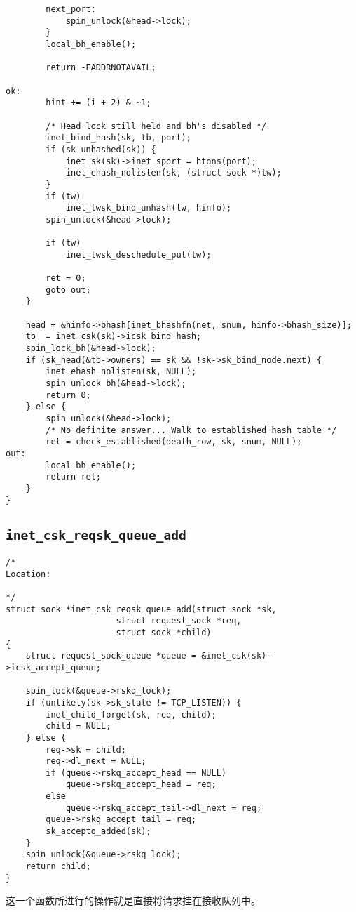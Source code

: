 \begin{verbatim}
        next_port:
            spin_unlock(&head->lock);
        }
        local_bh_enable();

        return -EADDRNOTAVAIL;

ok:
        hint += (i + 2) & ~1;

        /* Head lock still held and bh's disabled */
        inet_bind_hash(sk, tb, port);
        if (sk_unhashed(sk)) {
            inet_sk(sk)->inet_sport = htons(port);
            inet_ehash_nolisten(sk, (struct sock *)tw);
        }
        if (tw)
            inet_twsk_bind_unhash(tw, hinfo);
        spin_unlock(&head->lock);

        if (tw)
            inet_twsk_deschedule_put(tw);

        ret = 0;
        goto out;
    }

    head = &hinfo->bhash[inet_bhashfn(net, snum, hinfo->bhash_size)];
    tb  = inet_csk(sk)->icsk_bind_hash;
    spin_lock_bh(&head->lock);
    if (sk_head(&tb->owners) == sk && !sk->sk_bind_node.next) {
        inet_ehash_nolisten(sk, NULL);
        spin_unlock_bh(&head->lock);
        return 0;
    } else {
        spin_unlock(&head->lock);
        /* No definite answer... Walk to established hash table */
        ret = check_established(death_row, sk, snum, NULL);
out:
        local_bh_enable();
        return ret;
    }
}
\end{verbatim}
	\subsection{\texttt{inet_csk_reqsk_queue_add}}
		\label{INET:inet_csk_reqsk_queue_add}
\begin{verbatim}
/*
Location:

*/
struct sock *inet_csk_reqsk_queue_add(struct sock *sk,
                      struct request_sock *req,
                      struct sock *child)
{
    struct request_sock_queue *queue = &inet_csk(sk)->icsk_accept_queue;

    spin_lock(&queue->rskq_lock);
    if (unlikely(sk->sk_state != TCP_LISTEN)) {
        inet_child_forget(sk, req, child);
        child = NULL;
    } else {
        req->sk = child;
        req->dl_next = NULL;
        if (queue->rskq_accept_head == NULL)
            queue->rskq_accept_head = req;
        else
            queue->rskq_accept_tail->dl_next = req;
        queue->rskq_accept_tail = req;
        sk_acceptq_added(sk);
    }
    spin_unlock(&queue->rskq_lock);
    return child;
}
\end{verbatim}
        这一个函数所进行的操作就是直接将请求挂在接收队列中。

